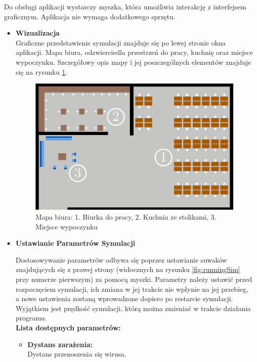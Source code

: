 Do obsługi aplikacji wystarczy myszka, która umożliwia interakcję z interfejsem graficznym. Aplikacja nie wymaga dodatkowego sprzętu.
\begin{itemize}
	\item \textbf{Wizualizacja}\\
	Graficzne przedstawienie symulacji znajduje się po lewej stronie okna aplikacji. Mapa biura, odzwierciedla przestrzeń do pracy, kuchnię oraz miejsce wypoczynku. Szczegółowy opis mapy i jej poszczególnych elementów znajduje się na rysunku \ref{fig:simMap}.

	\begin{figure}[h!]
		\includegraphics[width=\linewidth]{mapWithNumbers.png}
		\caption{Mapa biura: 1. Biurka do pracy, 2. Kuchnia ze stolikami, 3. Miejsce wypoczynku}
		\label{fig:simMap}
	\end{figure}
	
	\item \textbf{Ustawianie Parametrów Symulacji}
	
	Dostosowywanie parametrów odbywa się poprzez ustawianie suwaków znajdujących się z prawej strony (widocznych na rysunku \ref{fig:runningSim} przy numerze pierwszym) za pomocą myszki. Parametry należy ustawić przed rozpoczęciem symulacji, ich zmiana w jej trakcie nie wpłynie na jej przebieg, a nowe ustawienia zostaną wprowadzone dopiero po restarcie symulacji. Wyjątkiem jest prędkość symulacji, którą można zmieniać w trakcie działania programu.\\
	\textbf{Lista dostępnych parametrów:}
	\begin{itemize}
		\item \textbf{Dystans zarażenia:}\\
		 Dystans przenoszenia się wirusa.
		

\end{itemize}
\end{itemize}
